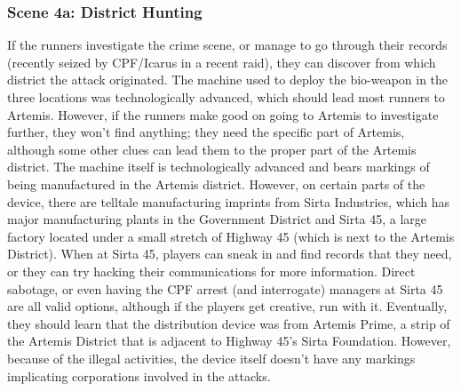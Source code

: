 \documentclass{article}
\begin{document}
\subsubsection{Scene 4a: District Hunting}
If the runners investigate the crime scene, or manage to go through their records (recently seized by CPF/Icarus in a recent raid), they can discover from which district the attack originated. The machine used to deploy the bio-weapon in the three locations was technologically advanced, which should lead most runners to Artemis. However, if the runners make good on going to Artemis to investigate further, they won’t find anything; they need the specific part of Artemis, although some other clues can lead them to the proper part of the Artemis district.
The machine itself is technologically advanced and bears markings of being manufactured in the Artemis district. However, on certain parts of the device, there are telltale manufacturing imprints from Sirta Industries, which has major manufacturing plants in the Government District and Sirta 45, a large factory located under a small stretch of Highway 45 (which is next to the Artemis District).
When at Sirta 45, players can sneak in and find records that they need, or they can try hacking their communications for more information. Direct sabotage, or even having the CPF arrest (and interrogate) managers at Sirta 45 are all valid options, although if the players get creative, run with it. Eventually, they should learn that the distribution device was from Artemis Prime, a strip of the Artemis District that is adjacent to Highway 45’s Sirta Foundation. However, because of the illegal activities, the device itself doesn’t have any markings implicating corporations involved in the attacks.
\end{document}
